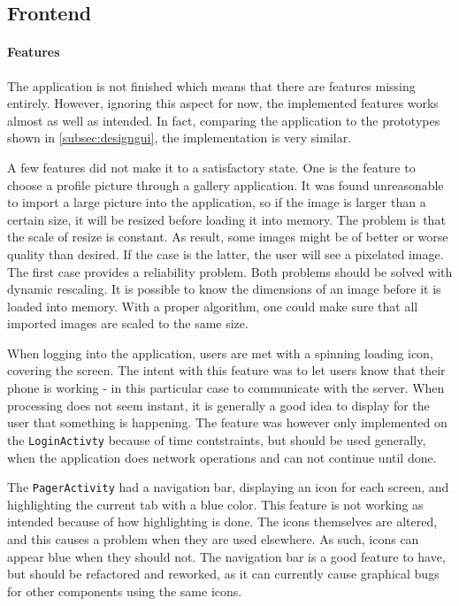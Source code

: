 \subsection{Frontend}
\label{subsec:frontend}

\paragraph{Features}
The application is not finished which means that there are features missing entirely. However, ignoring this aspect for now, the implemented features works almost as well as intended. In fact, comparing the application to the prototypes shown in \ref{subsec:designgui}, the implementation is very similar.

A few features did not make it to a satisfactory state. One is the feature to choose a profile picture through a gallery application. It was found unreasonable to import a large picture into the application, so if the image is larger than a certain size, it will be resized before loading it into memory. The problem is that the scale of resize is constant. As result, some images might be of better or worse quality than desired. If the case is the latter, the user will see a pixelated image. The first case provides a reliability problem.
Both problems should be solved with dynamic rescaling. It is possible to know the dimensions of an image before it is loaded into memory. With a proper algorithm, one could make sure that all imported images are scaled to the same size.

When logging into the application, users are met with a spinning loading icon, covering the screen. The intent with this feature was to let users know that their phone is working - in this particular case to communicate with the server. When processing does not seem instant, it is generally a good idea to display for the user that something is happening.
The feature was however only implemented on the \texttt{LoginActivty} because of time contstraints, but should be used generally, when the application does network operations and can not continue until done.

The \texttt{PagerActivity} had a navigation bar, displaying an icon for each screen, and highlighting the current tab with a blue color. This feature is not working as intended because of how highlighting is done. The icons themselves are altered, and this causes a problem when they are used elsewhere. As such, icons can appear blue when they should not. The navigation bar is a good feature to have, but should be refactored and reworked, as it can currently cause graphical bugs for other components using the same icons.

